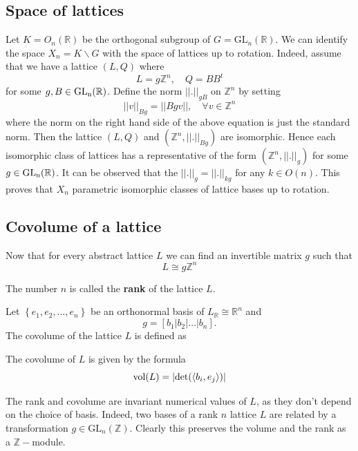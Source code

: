 \subsection{Space of lattices}
Let $K =O_n(\mathbb{R})$ be the orthogonal subgroup of $G= \mathrm{GL}_n(\mathbb{R})$. We can identify the space $X_n =K \backslash G$ with the space of lattices 
up to rotation. Indeed, assume that we have a lattice $(L,Q)$ where 
\[ L = g\mathbb{Z}^n, \quad Q = BB^t\]
for some $g, B \in \operatorname{\text{GL}_n(\mathbb{R})}$. Define the norm $||.||_{gB}$ on $\mathbb{Z}^n$ by setting 
\[||v||_{Bg} = ||Bgv||, \quad \forall v \in \mathbb{Z}^n\]
where the norm on the right hand side of the above equation is just the standard norm. Then the lattice $(L,Q)$ and $(\mathbb{Z}^n,||.||_{Bg})$ are isomorphic. Hence each isomorphic class of lattices 
has a representative of the form $(\mathbb{Z}^n, ||.||_g)$ for some $g \in \operatorname{\text{GL}_n(\mathbb{R})}$. It can be observed that the $||.||_g = ||.||_{kg}$ for any $k \in O(n)$. This proves that $X_n$ parametric isomorphic classes of lattice bases up to rotation.
\subsection{Covolume of a lattice}
Now that for every abstract lattice $L$ we can find an invertible matrix $g$ such that
\[ L  \cong g\mathbb{Z}^n\]


The number $n$ is called the \textbf{rank} of the lattice $L$.

Let $\left\lbrace e_1,e_2,\ldots,e_n \right\rbrace$ be an orthonormal basis of $L_\mathbb{R} \cong \mathbb{R}^n$ and
\[g = [b_1 | b_2 | \ldots | b_n] .\] The covolume of the lattice
$L$ is defined as
\begin{definition}\label{covolume-lattice-formula}
    The covolume of $L$ is given by the formula
    \[\operatorname{vol}(L) = \left|\det(\left\langle b_i,e_j\right\rangle)\right|\]
\end{definition}
The rank and covolume are invariant numerical values of $L$, as they don't depend on the choice of basis. Indeed, two bases of a rank $n$ lattice $L$
are related by a transformation $g \in \text{GL}_n(\mathbb{Z})$. Clearly this preserves the volume and the rank as a $\mathbb{Z}-$module.



